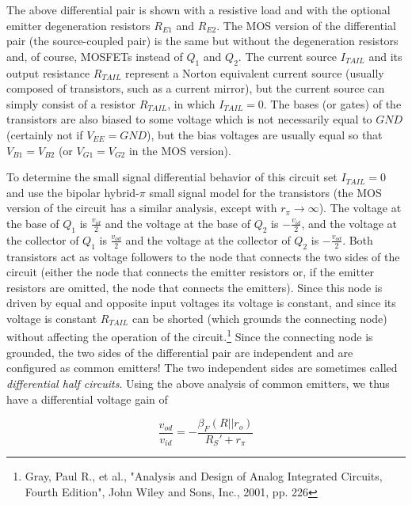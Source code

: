 The above differential pair is shown with a resistive load and with the optional emitter degeneration resistors $R_{E1}$ and $R_{E2}$. The MOS version of the differential pair (the source-coupled pair) is the same but without the degeneration resistors and, of course, MOSFETs instead of $Q_{1}$ and $Q_{2}$. The current source $I_{TAIL}$ and its output resistance $R_{TAIL}$ represent a Norton equivalent current source (usually composed of transistors, such as a current mirror), but the current source can simply consist of a resistor $R_{TAIL}$, in which $I_{TAIL} = 0$. The bases (or gates) of the transistors are also biased to some voltage which is not necessarily equal to $GND$ (certainly not if $V_{EE} = GND$), but the bias voltages are usually equal so that $V_{B1} = V_{B2}$ (or $V_{G1} = V_{G2}$ in the MOS version).
\par
To determine the small signal differential behavior of this circuit set $I_{TAIL} = 0$ and use the bipolar hybrid-$\pi$ small signal model for the transistors (the MOS version of the circuit has a similar analysis, except with $r_{\pi} \rightarrow \infty$). The voltage at the base of $Q_{1}$ is $\frac{v_{id}}{2}$ and the voltage at the base of $Q_{2}$ is $-\frac{v_{id}}{2}$, and the voltage at the collector of $Q_{1}$ is $\frac{v_{od}}{2}$ and the voltage at the collector of $Q_{2}$ is $-\frac{v_{od}}{2}$. Both transistors act as voltage followers to the node that connects the two sides of the circuit (either the node that connects the emitter resistors or, if the emitter resistors are omitted, the node that connects the emitters). Since this node is driven by equal and opposite input voltages its voltage is constant, and since its voltage is constant $R_{TAIL}$ can be shorted (which grounds the connecting node) without affecting the operation of the circuit.\footnote{Gray, Paul R., et al., "Analysis and Design of Analog Integrated Circuits, Fourth Edition", John Wiley and Sons, Inc., 2001, pp. 226} Since the connecting node is grounded, the two sides of the differential pair are independent and are configured as common emitters! The two independent sides are sometimes called \textit{differential half circuits}. Using the above analysis of common emitters, we thus have a differential voltage gain of

\begin{equation}
\frac{v_{od}}{v_{id}} = -\frac{\beta_{F} (R||r_{o})}{R_{S}' + r_{\pi}}
\end{equation}

